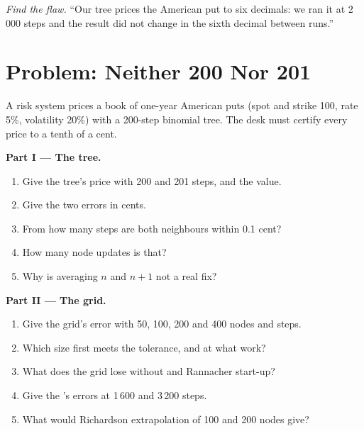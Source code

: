\begin{exercise}[$\star\star\star$]\label{exo:dv:trees-and-finite-difference-pricers-in-practice:8}
\emph{Find the flaw.} ``Our tree prices the American put to six decimals: we ran it at 2\,000 steps and the result did not change in the sixth decimal
between runs.''
\end{exercise}

\section{Problem: Neither 200 Nor 201}

\begin{problem}\label{pb:dv:trees-and-finite-difference-pricers-in-practice:1}
A risk system prices a book of one-year American puts (spot and strike 100, rate 5\%, volatility 20\%) with a 200-step binomial tree. The desk must certify every
price to a tenth of a cent.

\medskip\noindent\textbf{Part I --- The tree.}
\begin{enumerate}
\item Give the tree's price with 200 and 201 steps, and the value.
\item Give the two errors in cents.
\item From how many steps are both neighbours within 0.1 cent?
\item How many node updates is that?
\item Why is averaging $n$ and $n+1$ not a real fix?
\end{enumerate}

\medskip\noindent\textbf{Part II --- The grid.}
\begin{enumerate}[resume]
\item Give the grid's error with 50, 100, 200 and 400 nodes and steps.
\item Which size first meets the tolerance, and at what work?
\item What does the grid lose without  and Rannacher start-up?
\item Give the 's errors at 1\,600 and 3\,200 steps.
\item What would Richardson extrapolation of 100 and 200 nodes give?
\end{enumerate}


\end{problem}
